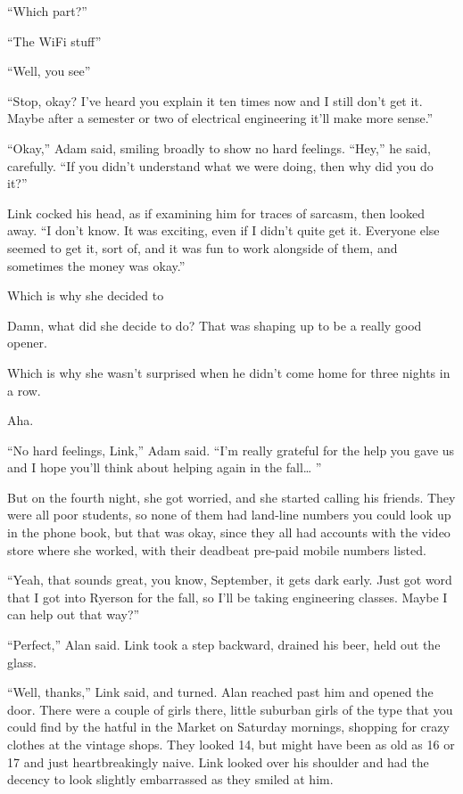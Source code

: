 ``Which part?''

``The WiFi stuff\dash{}''

``Well, you see\dash{}''

``Stop, okay?  I've heard you explain it ten times now and I still
don't get it.  Maybe after a semester or two of electrical engineering
it'll make more sense.''

``Okay,'' Adam said, smiling broadly to show no hard feelings. 
``Hey,'' he said, carefully.  ``If you didn't understand what we were
doing, then why did you do it?''

Link cocked his head, as if examining him for traces of sarcasm, then
looked away.  ``I don't know.  It was exciting, even if I didn't quite
get it.  Everyone else seemed to get it, sort of, and it was fun to
work alongside of them, and sometimes the money was okay.''

Which is why she decided to\dash{}

Damn, what did she decide to do?  That was shaping up to be a really
good opener.

Which is why she wasn't surprised when he didn't come home for three
nights in a row.

Aha.

``No hard feelings, Link,'' Adam said.  ``I'm really grateful for the
help you gave us and I hope you'll think about helping again in the
fall\ldots{}  ''

But on the fourth night, she got worried, and she started calling his
friends.  They were all poor students, so none of them had land-line
numbers you could look up in the phone book, but that was okay, since
they all had accounts with the video store where she worked, with
their deadbeat pre-paid mobile numbers listed.

``Yeah, that sounds great, you know, September, it gets dark early. 
Just got word that I got into Ryerson for the fall, so I'll be taking
engineering classes.  Maybe I can help out that way?''

``Perfect,'' Alan said.  Link took a step backward, drained his beer,
held out the glass.

``Well, thanks,'' Link said, and turned.  Alan reached past him and
opened the door.  There were a couple of girls there, little suburban
girls of the type that you could find by the hatful in the Market on
Saturday mornings, shopping for crazy clothes at the vintage shops. 
They looked 14, but might have been as old as 16 or 17 and just
heartbreakingly naive.  Link looked over his shoulder and had the
decency to look slightly embarrassed as they smiled at him.

